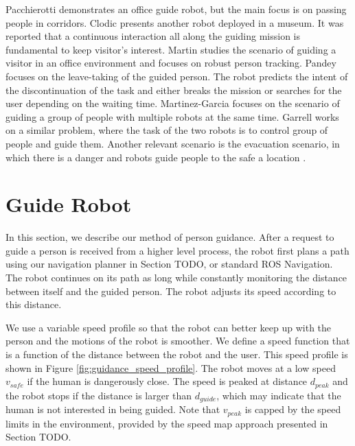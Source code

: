 Pacchierotti \cite{pacchierotti2006design} demonstrates an office guide robot, but the main focus is on passing people in corridors. Clodic \cite{clodic2006rackham} presents another robot deployed in a museum. It was reported that a continuous interaction all along the guiding mission is fundamental to keep visitor's interest. Martin \cite{martin2004conception} studies the scenario of guiding a visitor in an office environment and focuses on robust person tracking. Pandey \cite{pandey2009step} focuses on the leave-taking of the guided person. The robot predicts the intent of the discontinuation of the task and either breaks the mission or searches for the user depending on the waiting time. Martinez-Garcia \cite{martinez2005crowding} focuses on the scenario of guiding a group of people with multiple robots at the same time. Garrell \cite{garrell2010local} works on a similar problem, where the task of the two robots is to control group of people and guide them. Another relevant scenario is the evacuation scenario, in which there is a danger and robots guide people to the safe a location \cite{kim2009portable,robinette2011incorporating}.

\section{Guide Robot}
\label{sec:guidance_guide_robot}

In this section, we describe our method of person guidance. After a request to guide a person is received from a higher level process, the robot first plans a path using our navigation planner in Section TODO, or standard ROS Navigation. The robot continues on its path as long while constantly monitoring the distance between itself and the guided person. The robot adjusts its speed according to this distance. 

We use a variable speed profile so that the robot can better keep up with the person and the motions of the robot is smoother. We define a speed function that is a function of the distance between the robot and the user. This speed profile is shown in Figure \ref{fig:guidance_speed_profile}. The robot moves at a low speed $v_{safe}$ if the human is dangerously close. The speed is peaked at distance $d_{peak}$ and the robot stops if the distance is larger than $d_{guide}$, which may indicate that the human is not interested in being guided. Note that $v_{peak}$ is capped by the speed limits in the environment, provided by the speed map approach presented in Section TODO.


